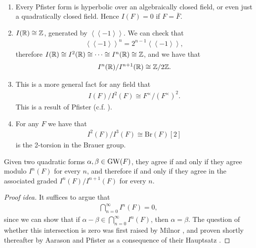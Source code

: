 \documentclass[11pt,openany]{book}
\providecommand{\Br}{\mathrm{Br}}
\newcommand{\Pfister}[1]{\left\langle\! \left\langle #1 \right\rangle\! \right\rangle}
\begin{document}
\begin{example} \,
\begin{enumerate}
    \item Every Pfister form is hyperbolic over an algebraically closed field, or even just a quadratically closed field. Hence $I(F) = 0$ if $F = \bar{F}$.
    \item $I(\mathbb{R}) \cong \mathbb{Z}$, generated by $\Pfister{-1}$. We can check that
    \begin{align*}
         \Pfister{-1}^n = 2^{n -1}\Pfister{-1},
    \end{align*}
    therefore $I(\mathbb{R}) \cong I^2(\mathbb{R}) \cong \cdots \cong I^n(\mathbb{R}) \cong \mathbb{Z}$, and we have that
    \begin{align*}
        I^n(\mathbb{R})/I^{n+1}(\mathbb{R}) \cong \mathbb{Z}/2\mathbb{Z}.
    \end{align*}
    \item This is a more general fact for any field that
    \begin{align*}
        I(F)/I^2(F) \cong F^\times/\left( F^\times \right)^2.
    \end{align*}
    This is a result of Pfister (c.f. \cite[II.2.3]{Lam-quad}).

    \item For any $F$ we have that
    \begin{align*}
        I^2(F)/I^3(F) \cong \Br(F)[2]
    \end{align*}
    is the 2-torsion in the Brauer group.
\end{enumerate}
\end{example}




\begin{proposition} Given two quadratic forms $\alpha,\beta \in \mathrm{GW}(F)$, they agree if and only if they agree modulo $I^n(F)$ for every $n$, and therefore if and only if they agree in the associated graded $I^n(F)/I^{n+1}(F)$ for every $n$.
\end{proposition}
\begin{proof}[Proof idea] It suffices to argue that
\begin{align*}
    \bigcap_{n=0}^\infty I^n(F) = 0,
\end{align*}
since we can show that if $\alpha - \beta \in \bigcap_{n=0}^\infty I^n(F)$, then $\alpha = \beta$. The question of whether this intersection is zero was first raised by Milnor \cite[4.4]{MilnorK}, and proven shortly thereafter by Aarason and Pfister as a consequence of their Hauptsatz \cite[X.5.1]{Lam-quad}.
\end{proof}
\end{document}
